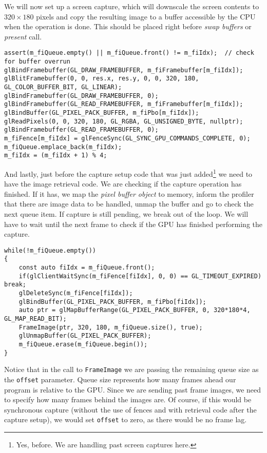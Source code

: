\documentclass[hidelinks,titlepage,a4paper,twoside]{article}
\begin{document}
We will now set up a screen capture, which will downscale the screen contents to $320\times180$ pixels and copy the resulting image to a buffer accessible by the CPU when the operation is done. This should be placed right before \emph{swap buffers} or \emph{present} call.

\begin{lstlisting}
assert(m_fiQueue.empty() || m_fiQueue.front() != m_fiIdx);	// check for buffer overrun
glBindFramebuffer(GL_DRAW_FRAMEBUFFER, m_fiFramebuffer[m_fiIdx]);
glBlitFramebuffer(0, 0, res.x, res.y, 0, 0, 320, 180, GL_COLOR_BUFFER_BIT, GL_LINEAR);
glBindFramebuffer(GL_DRAW_FRAMEBUFFER, 0);
glBindFramebuffer(GL_READ_FRAMEBUFFER, m_fiFramebuffer[m_fiIdx]);
glBindBuffer(GL_PIXEL_PACK_BUFFER, m_fiPbo[m_fiIdx]);
glReadPixels(0, 0, 320, 180, GL_RGBA, GL_UNSIGNED_BYTE, nullptr);
glBindFramebuffer(GL_READ_FRAMEBUFFER, 0);
m_fiFence[m_fiIdx] = glFenceSync(GL_SYNC_GPU_COMMANDS_COMPLETE, 0);
m_fiQueue.emplace_back(m_fiIdx);
m_fiIdx = (m_fiIdx + 1) % 4;
\end{lstlisting}

And lastly, just before the capture setup code that was just added\footnote{Yes, before. We are handling past screen captures here.} we need to have the image retrieval code. We are checking if the capture operation has finished. If it has, we map the \emph{pixel buffer object} to memory, inform the profiler that there are image data to be handled, unmap the buffer and go to check the next queue item. If capture is still pending, we break out of the loop. We will have to wait until the next frame to check if the GPU has finished performing the capture.

\begin{lstlisting}
while(!m_fiQueue.empty())
{
    const auto fiIdx = m_fiQueue.front();
    if(glClientWaitSync(m_fiFence[fiIdx], 0, 0) == GL_TIMEOUT_EXPIRED) break;
    glDeleteSync(m_fiFence[fiIdx]);
    glBindBuffer(GL_PIXEL_PACK_BUFFER, m_fiPbo[fiIdx]);
    auto ptr = glMapBufferRange(GL_PIXEL_PACK_BUFFER, 0, 320*180*4, GL_MAP_READ_BIT);
    FrameImage(ptr, 320, 180, m_fiQueue.size(), true);
    glUnmapBuffer(GL_PIXEL_PACK_BUFFER);
    m_fiQueue.erase(m_fiQueue.begin());
}
\end{lstlisting}

Notice that in the call to \texttt{FrameImage} we are passing the remaining queue size as the \texttt{offset} parameter. Queue size represents how many frames ahead our program is relative to the GPU. Since we are sending past frame images, we need to specify how many frames behind the images are. Of course, if this would be synchronous capture (without the use of fences and with retrieval code after the capture setup), we would set \texttt{offset} to zero, as there would be no frame lag.
\end{document}
